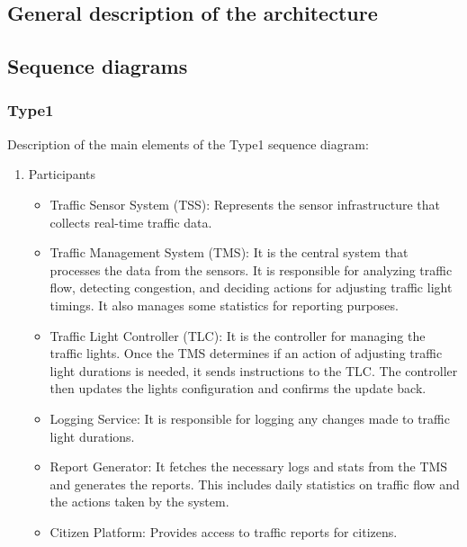 \documentclass[11.5pt]{article}
\begin{document}
    \subsection{General description of the architecture}
    \subsection{Sequence diagrams}
    \subsubsection{Type1}
    Description of the main elements of the Type1 sequence diagram:
    \begin{enumerate}
        \item Participants
        \begin{itemize}
        \item Traffic Sensor System (TSS): Represents the sensor infrastructure that collects real-time traffic data.  
        \item Traffic Management System (TMS): It is the central system that processes the data from the sensors. It is responsible for analyzing traffic flow, detecting congestion, and deciding actions for adjusting traffic light timings. It also manages some statistics for reporting purposes.
        \item Traffic Light Controller (TLC): It is the controller for managing the traffic lights. Once the TMS determines if an action of adjusting traffic light durations is needed, it sends instructions to the TLC. The controller then updates the lights configuration and confirms the update back.
        \item Logging Service: It is responsible for logging any changes made to traffic light durations.
        \item Report Generator: It fetches the necessary logs and stats from the TMS and generates the reports. This includes daily statistics on traffic flow and the actions taken by the system.
        \item Citizen Platform: Provides access to traffic reports for citizens.
    \end{itemize}


\end{enumerate}
\end{document}
